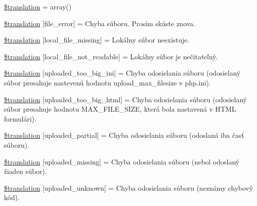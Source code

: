 \begin{DoxyCompactItemize}
\item 
\hyperlink{class_8upload_8sk___s_k_8php_a1f198d410fecc3871ebdd468d343a5e3}{\$translation} = array()
\item 
\hyperlink{class_8upload_8sk___s_k_8php_ac7498e49b9771b04698029aa61c70821}{\$translation} \mbox{[}\textquotesingle{}file\+\_\+error\textquotesingle{}\mbox{]} = \textquotesingle{}Chyba súboru. Prosím skúste znova.\textquotesingle{}
\item 
\hyperlink{class_8upload_8sk___s_k_8php_a6ec3d3a47ab70d77e7aa593e82ead10e}{\$translation} \mbox{[}\textquotesingle{}local\+\_\+file\+\_\+missing\textquotesingle{}\mbox{]} = \textquotesingle{}Lokálny súbor neexistuje.\textquotesingle{}
\item 
\hyperlink{class_8upload_8sk___s_k_8php_a60104befef9b241f3a7a6a755618a4b3}{\$translation} \mbox{[}\textquotesingle{}local\+\_\+file\+\_\+not\+\_\+readable\textquotesingle{}\mbox{]} = \textquotesingle{}Lokálny súbor je nečitateľný.\textquotesingle{}
\item 
\hyperlink{class_8upload_8sk___s_k_8php_a6a08dcd0d3651fdd098568f6b2f0a42c}{\$translation} \mbox{[}\textquotesingle{}uploaded\+\_\+too\+\_\+big\+\_\+ini\textquotesingle{}\mbox{]} = \textquotesingle{}Chyba odosielania súboru (odosielaný súbor presahuje nastevenú hodnotu upload\+\_\+max\+\_\+filesize v php.\+ini).\textquotesingle{}
\item 
\hyperlink{class_8upload_8sk___s_k_8php_a623d5b8b92169f57d7e43458aa911cbb}{\$translation} \mbox{[}\textquotesingle{}uploaded\+\_\+too\+\_\+big\+\_\+html\textquotesingle{}\mbox{]} = \textquotesingle{}Chyba odosielania súboru (odosielaný súbor presahuje hodnotu M\+A\+X\+\_\+\+F\+I\+L\+E\+\_\+\+S\+I\+Z\+E, která bola nastavená v H\+T\+M\+L formulári).\textquotesingle{}
\item 
\hyperlink{class_8upload_8sk___s_k_8php_a967c17da21b0a2d3bd65cca3a9ca0ea8}{\$translation} \mbox{[}\textquotesingle{}uploaded\+\_\+partial\textquotesingle{}\mbox{]} = \textquotesingle{}Chyba odosielania súboru (odoslaná iba časť súboru).\textquotesingle{}
\item 
\hyperlink{class_8upload_8sk___s_k_8php_a0cce433260be65f1f35853a6b4b8952b}{\$translation} \mbox{[}\textquotesingle{}uploaded\+\_\+missing\textquotesingle{}\mbox{]} = \textquotesingle{}Chyba odosielania súboru (nebol odoslaný žiaden súbor).\textquotesingle{}
\item 
\hyperlink{class_8upload_8sk___s_k_8php_a4a9168e922b827e6a28b5db1c00774ca}{\$translation} \mbox{[}\textquotesingle{}uploaded\+\_\+unknown\textquotesingle{}\mbox{]} = \textquotesingle{}Chyba odosielania súboru (neznámy chybový kód).\textquotesingle{}

\end{DoxyCompactItemize}
